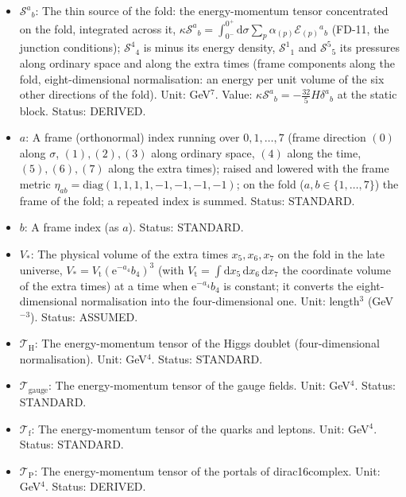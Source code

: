 \documentclass[
  10pt,
]{article}
\providecommand{\tightlist}{%
  \setlength{\itemsep}{0pt}\setlength{\parskip}{0pt}}
\begin{document}
\begin{itemize}
\tightlist
\item
  \(\mathcal{S}^a{}_b\): The thin source of the fold: the
  energy-momentum tensor concentrated on the fold, integrated across it,
  \(\kappa\mathcal{S}^a{}_b = \int_{0^-}^{0^+}\mathrm{d}\sigma\sum_p\alpha_{(p)}\mathcal{E}_{(p)}{}^a{}_b\)
  (FD-11, the junction conditions); \(\mathcal{S}^4{}_4\) is minus its
  energy density, \(\mathcal{S}^1{}_1\) and \(\mathcal{S}^5{}_5\) its
  pressures along ordinary space and along the extra times (frame
  components along the fold, eight-dimensional normalisation: an energy
  per unit volume of the six other directions of the fold). Unit:
  GeV\(^7\). Value:
  \(\kappa\mathcal{S}^a{}_b = -\frac{32}{5}H\delta^a{}_b\) at the static
  block. Status: DERIVED.
\item
  \(a\): A frame (orthonormal) index running over \(0, 1, \dots, 7\)
  (frame direction \((0)\) along \(\sigma\), \((1), (2), (3)\) along
  ordinary space, \((4)\) along the time, \((5), (6), (7)\) along the
  extra times); raised and lowered with the frame metric
  \(\eta_{ab} = \mathrm{diag}(1, 1, 1, 1, -1, -1, -1, -1)\); on the fold
  (\(a, b \in \{1, \dots, 7\}\)) the frame of the fold; a repeated index
  is summed. Status: STANDARD.
\item
  \(b\): A frame index (as \(a\)). Status: STANDARD.
\item
  \(V_*\): The physical volume of the extra times \(x_5, x_6, x_7\) on
  the fold in the late universe,
  \(V_* = V_{\mathrm{t}}(\mathrm{e}^{-a_4}b_4)^3\) (with
  \(V_{\mathrm{t}} = \int\mathrm{d}x_5\,\mathrm{d}x_6\,\mathrm{d}x_7\)
  the coordinate volume of the extra times) at a time when
  \(\mathrm{e}^{-a_4}b_4\) is constant; it converts the
  eight-dimensional normalisation into the four-dimensional one. Unit:
  length\(^3\) (GeV\(^{-3}\)). Status: ASSUMED.
\item
  \(\mathcal{T}_{\mathrm{H}}\): The energy-momentum tensor of the Higgs
  doublet (four-dimensional normalisation). Unit: GeV\(^4\). Status:
  STANDARD.
\item
  \(\mathcal{T}_{\mathrm{gauge}}\): The energy-momentum tensor of the
  gauge fields. Unit: GeV\(^4\). Status: STANDARD.
\item
  \(\mathcal{T}_{\mathrm{f}}\): The energy-momentum tensor of the quarks
  and leptons. Unit: GeV\(^4\). Status: STANDARD.
\item
  \(\mathcal{T}_{\mathrm{P}}\): The energy-momentum tensor of the
  portals of dirac16complex. Unit: GeV\(^4\). Status: DERIVED.

\end{itemize}
\end{document}
